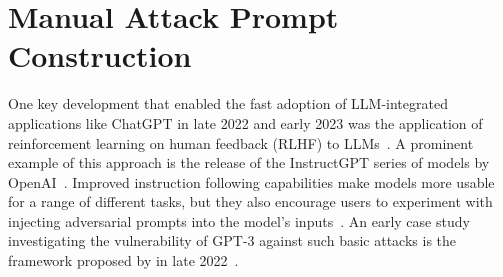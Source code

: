 \section{Manual Attack Prompt Construction} \label{sec:manual_prompts}
One key development that enabled the fast adoption of LLM-integrated applications like ChatGPT in late 2022 and early 2023 was the application of reinforcement learning on human feedback (RLHF) to LLMs~\cite{chaudhari_rlhf_2025}.
A prominent example of this approach is the release of the InstructGPT series of models by OpenAI~\cite{ouyang_training_2022}.
Improved instruction following capabilities make models more usable for a range of different tasks, but they also encourage users to experiment with injecting adversarial prompts into the model's inputs~\cite{willison_prompt_nodate, preamble_discovery_nodate}.
An early case study investigating the vulnerability of GPT-3 against such basic attacks is the framework proposed by \perez in late 2022~\cite{perez_ignore_2022}.\\

